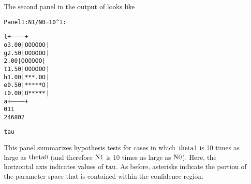 The second panel in the output of  looks like
\begin{alltt}
\begin{minipage}{\textwidth}
Panel 1: N1/N0 = 10^1:

l          +-----------+
o    3.00  |O O O O O O|
g    2.50  |O O O O O O|
     2.00  |O O O O O O|
t    1.50  |O O O O O O|
h    1.00  |* * * . O O|
e    0.50  |* * * * * O|
t    0.00  |O * * * * *|
a          +-----------+
0                   1 1 
            2 4 6 8 0 2 
                        
                    tau 
\end{minipage}
\end{alltt}
This panel summarizes hypothesis tests for cases in which $\hbox{theta1}$ is
10 times as large as $\hbox{theta0}$ (and therefore $\hbox{N1}$ is 10 times as
large as $\hbox{N0}$).  Here, the horizontal axis indicates values of
$\hbox{tau}$.  As before, asterisks indicate the portion of the parameter
space that is contained within the confidence region.
